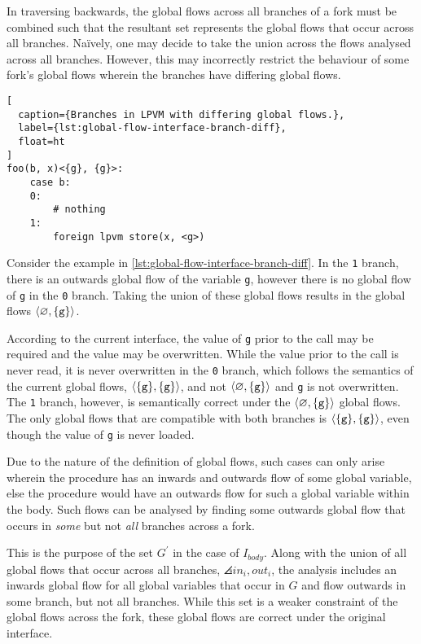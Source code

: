 In traversing backwards, the global flows across all branches of a fork must be combined such that the resultant set represents the global flows that occur across all branches. Na\"ively, one may decide to take the union across the flows analysed across all branches. However, this may incorrectly restrict the behaviour of some fork's global flows wherein the branches have differing global flows. 

\begin{lstlisting}[
  caption={Branches in LPVM with differing global flows.},
  label={lst:global-flow-interface-branch-diff},
  float=ht
]
foo(b, x)<{g}, {g}>:
    case b:
    0: 
        # nothing
    1:
        foreign lpvm store(x, <g>)
\end{lstlisting}

Consider the example in \cref{lst:global-flow-interface-branch-diff}. In the \texttt{1} branch, there is an outwards global flow of the variable \texttt{g}, however there is no global flow of \texttt{g} in the \texttt{0} branch. Taking the union of these global flows results in the global flows $\langle\varnothing, \lbrace\mathtt{g}\rbrace\rangle$. 

According to the current interface, the value of \texttt{g} prior to the call may be required and the value may be overwritten. While the value prior to the call is never read, it is never overwritten in the \texttt{0} branch, which follows the semantics of the current global flows, $\langle\lbrace\mathtt{g}\rbrace, \lbrace\mathtt{g}\rbrace\rangle$, and not $\langle\varnothing, \lbrace\mathtt{g}\rbrace\rangle$ and \texttt{g} is not overwritten. The \texttt{1} branch, however, is semantically correct under the $\langle\varnothing, \lbrace\mathtt{g}\rbrace\rangle$ global flows. The only global flows that are compatible with both branches is $\langle\lbrace\mathtt{g}\rbrace, \lbrace\mathtt{g}\rbrace\rangle$, even though the value of \texttt{g} is never loaded.

Due to the nature of the definition of global flows, such cases can only arise wherein the procedure has an inwards and outwards flow of some global variable, else the procedure would have an outwards flow for such a global variable within the body. Such flows can be analysed by finding some outwards global flow that occurs in \textit{some} but not \textit{all} branches across a fork. 

This is the purpose of the set $G^\prime$ in the case of $I_{body}$. Along with the union of all global flows that occur across all branches, $\angles{in_i, out_i}$, the analysis includes an inwards global flow for all global variables that occur in $G$ and flow outwards in some branch, but not all branches. While this set is a weaker constraint of the global flows across the fork, these global flows are correct under the original interface.

